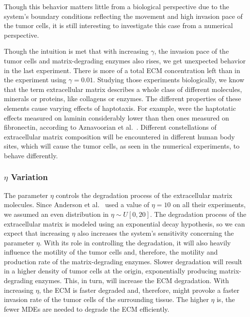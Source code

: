 Though this behavior matters little from a biological perspective due to the system's boundary conditions reflecting the movement and high invasion pace of the tumor cells, it is still interesting to investigate this case from a numerical perspective.

Though the intuition is met that with increasing $\gamma$, the invasion pace of the tumor cells and matrix-degrading enzymes also rises, we get unexpected behavior in the last experiment. There is more of a total ECM concentration left than in the experiment using $\gamma=0.01$.
Studying those experiments biologically, we know that the term extracellular matrix describes a whole class of different molecules, minerals or proteins, like collagens or enzymes. The different properties of these elements cause varying effects of haptotaxis. For example, were the haptotatic effects measured on laminin considerably lower than then ones measured on fibronectin, according to Aznavoorian et al.~\cite{article}. Different constellations of extracellular matrix composition will be encountered in different human body sites, which will cause the tumor cells, as seen in the numerical experiments, to behave differently.

\subsubsection*{$\eta$ Variation}
The parameter $\eta$ controls the degradation process of the extracellular matrix molecules. Since Anderson et al.~\cite{anderson_mathematical_2000} used a value of $\eta=10$ on all their experiments, we assumed an even distribution in $\eta \sim U[0, 20]$. The degradation process of the extracellular matrix is modeled using an exponential decay hypothesis, so we can expect that increasing $\eta$ also increases the system's sensitivity concerning the parameter $\eta$. With its role in controlling the degradation, it will also heavily influence the motility of the tumor cells and, therefore, the motility and production rate of the matrix-degrading enzymes. Slower degradation will result in a higher density of tumor cells at the origin, exponentially producing matrix-degrading enzymes. This, in turn, will increase the ECM degradation. With increasing $\eta$, the ECM is faster degraded and, therefore, might provoke a faster invasion rate of the tumor cells of the surrounding tissue. The higher $\eta$ is, the fewer MDEs are needed to degrade the ECM efficiently.

